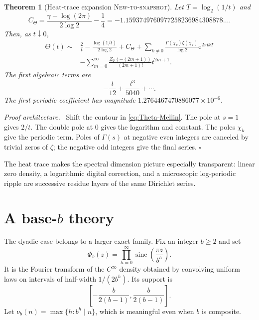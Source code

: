 \documentclass[11pt,oneside]{article}
\numberwithin{equation}{section}
\newtheorem{theorem}{Theorem}[section]
\theoremstyle{definition}
\theoremstyle{remark}
\newcommand{\ii}{\mathrm i}
\newcommand{\e}{\mathrm e}
\newcommand{\sinc}{\operatorname{sinc}}
\newcommand{\NewResult}{\textsc{New-to-snapshot}}
\newenvironment{proofidea}
  {\par\smallskip\noindent\textit{Proof architecture.}\ }
  {\hfill$\square$\par\smallskip}
\begin{document}
\begin{theorem}[Heat-trace expansion \NewResult]
\label{thm:heat}
Let $T=\log_2(1/t)$ and
\begin{equation}
 C_{\Theta}=\frac{\gamma-\log(2\pi)}{2\log2}-\frac14
 =-1.1593749760977258236984308878\ldots.                  \label{eq:Ctheta}
\end{equation}
Then, as $t\downarrow0$,
\begin{align}
 \Theta(t)\sim{}&\frac2t-\frac{\log(1/t)}{2\log2}+C_{\Theta}
 +\sum_{k\ne0}\frac{\Gamma(\chi_k)\zeta(\chi_k)}{\log2}
   \e^{2\pi\ii kT}                                      \label{eq:heat-asymp}\\
 &-\sum_{m=0}^{\infty}
 \frac{Z_\Phi(-(2m+1))}{(2m+1)!}t^{2m+1}.\nonumber
\end{align}
The first algebraic terms are
\begin{equation}
 -\frac{t}{12}+\frac{t^3}{5040}+\cdots.                   \label{eq:heat-first}
\end{equation}
The first periodic coefficient has magnitude
$1.2764467470886077\times10^{-6}$.
\end{theorem}

\begin{proofidea}
Shift the contour in \eqref{eq:Theta-Mellin}.  The pole at $s=1$ gives $2/t$.
The double pole at $0$ gives the logarithm and constant.  The poles $\chi_k$
give the periodic term.  Poles of $\Gamma(s)$ at negative even integers are
canceled by trivial zeros of $\zeta$; the negative odd integers give the final
series.
\end{proofidea}

The heat trace makes the spectral dimension picture especially transparent:
linear zero density, a logarithmic digital correction, and a microscopic
log-periodic ripple are successive residue layers of the same Dirichlet series.

\section{A base-$b$ theory}
\label{sec:baseb}

The dyadic case belongs to a larger exact family.  Fix an integer $b\ge2$ and set
\begin{equation}
 \Phi_b(z)=\prod_{h=0}^{\infty}\sinc\!\left(\frac{\pi z}{b^h}\right).       \label{eq:Phib}
\end{equation}
It is the Fourier transform of the $C^\infty$ density obtained by convolving
uniform laws on intervals of half-width $1/(2b^h)$.  Its support is
\begin{equation}
 \left[-\frac{b}{2(b-1)},\frac{b}{2(b-1)}\right].          \label{eq:supportb}
\end{equation}
Let $\nu_b(n)=\max\{h:b^h\mid n\}$, which is meaningful even when $b$ is
composite.
\end{document}
